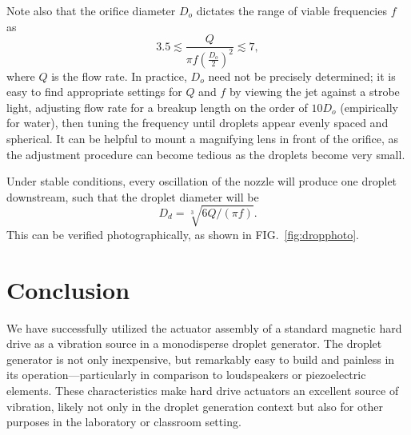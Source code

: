 \documentclass[aip,rsi,reprint,graphicx]{revtex4-1} %
\begin{document}
Note also that the orifice diameter $D_o$ dictates the range of viable
frequencies $f$ as 
\begin{equation*}
    3.5 \lesssim \frac{Q}{\pi f \left(\frac{D_o}{2}\right)^2}
\lesssim 7,
\end{equation*}
where $Q$ is the flow rate.\cite{Savart33, Rayleigh79} In
practice, $D_o$ need not be
precisely determined; it is easy to find appropriate settings for $Q$
and $f$ by viewing the jet against a strobe light, adjusting flow rate for a breakup
length on the order of $10 D_o$ (empirically for water), then tuning the frequency
until droplets appear evenly spaced and spherical. It can be helpful to mount a
magnifying lens in front of the orifice, as the adjustment procedure can become
tedious as the droplets become very small.

Under stable conditions, every oscillation of the nozzle will produce one droplet
downstream,\cite{Rayleigh79} such that the droplet diameter will be 
\begin{equation*}D_d = \sqrt[3]{6Q/(\pi f)}.\end{equation*} This can be verified photographically, as shown in
FIG.~\ref{fig:dropphoto}.

\section{Conclusion}
We have successfully utilized the actuator assembly of a standard magnetic hard
drive as a vibration source in a monodisperse droplet generator. The droplet
generator is not only inexpensive, but remarkably easy to build and painless in
its operation---particularly in comparison to loudspeakers or piezoelectric elements.
These characteristics make hard drive actuators an excellent source of
vibration, likely not only in the droplet generation context but also for other
purposes in the laboratory or classroom setting.

\end{document}
